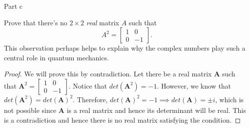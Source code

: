 \begin{solution}{Part c}\label{ques:2c}
  \begin{question}
    Prove that there's no $2 \times 2$ \emph{real} matrix $A$ such
    that
    \[
    A^2=
    \begin{bmatrix}
      1 & 0\\
      0 & -1
    \end{bmatrix}\!.
    \]
    This observation perhaps helps to explain why the complex numbers play such a
    central role in quantum mechanics.
  \end{question}
  \tcblower{}
  \begin{proof}
    We will prove this by contradiction. Let there be a real matrix $\mathbf{A}$ such that $\mathbf{A}^2 = \begin{bmatrix} 1 & 0\\ 0 & -1 \end{bmatrix}$. Notice that $det(\mathbf{A}^2) = -1$. However, we know that $det(\mathbf{A}^2) = det(\mathbf{A})^2$. Therefore, $det(\mathbf{A})^2 = -1 \implies det(\mathbf{A}) = \pm i$, which is not possible since $\mathbf{A}$ is a real matrix and hence its determinant will be real. This is a contradiction and hence there is no real matrix satisfying the condition.
  \end{proof}
\end{solution}
